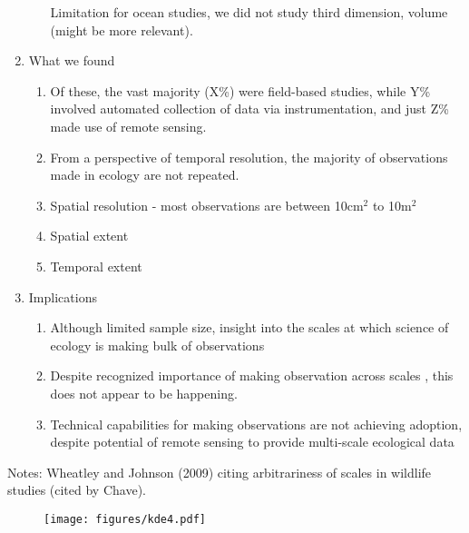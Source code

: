 \documentclass[12pt]{article}
\begin{document}
\begin{enumerate}
\begin{enumerate}
    \subitem Limitation for ocean studies, we did not study third dimension, volume (might be more relevant). 
   \end{enumerate}
   \item{What we found} 
   \begin{enumerate}
    \item  Of these, the vast majority (X\%) were field-based studies, while Y\% involved automated collection of data via instrumentation, and just Z\% made use of remote sensing.   
    \item From a perspective of temporal resolution, the majority of observations made in ecology are not repeated.
    \item Spatial resolution - most observations are between 10cm$^2$ to 10m$^2$
    \item Spatial extent
    \item Temporal extent
   \end{enumerate}
   \item{Implications} 
   \begin{enumerate}
    \item Although limited sample size, insight into the scales at which science of ecology is making bulk of observations
    \item Despite recognized importance of making observation across scales \cite{levin_problem_1992}, this does not appear to be happening. 
    \item Technical capabilities for making observations are not achieving adoption, despite potential of remote sensing to provide multi-scale ecological data \cite{estes_predictive_2011,estes_habitat_2008} 
   \end{enumerate}

\end{enumerate}

Notes: Wheatley and Johnson (2009) citing arbitrariness of scales in wildlife studies (cited by Chave). 

\begin{figure}[!ht]
\texttt{[image: figures/kde4.pdf]}
\vspace{-0.15 cm}
\caption{}
\label{afoto1}
\end{figure}
\end{document}
